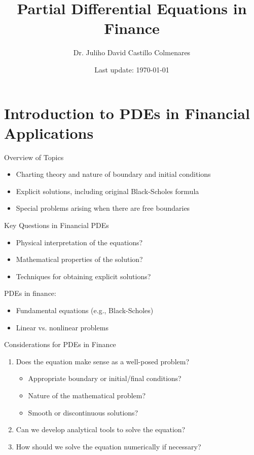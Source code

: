 \documentclass{beamer}
\title{Partial Differential Equations in Finance}
\author{Dr. Juliho David Castillo Colmenares}
\date{Last update: \today}
\begin{document}
\frame{\titlepage}

\section{Introduction to PDEs in Financial Applications}

\begin{frame}{Overview of Topics}
    \begin{itemize}
        \item Charting theory and nature of boundary and initial conditions
        \item Explicit solutions, including original Black-Scholes formula
        \item Special problems arising when there are free boundaries
    \end{itemize}
\end{frame}

\begin{frame}{Key Questions in Financial PDEs}
    \begin{itemize}
        \item Physical interpretation of the equations?
        \item Mathematical properties of the solution?
        \item Techniques for obtaining explicit solutions?
    \end{itemize}
    
    \vspace{1cm}
    PDEs in finance:
    \begin{itemize}
        \item Fundamental equations (e.g., Black-Scholes)
        \item Linear vs. nonlinear problems
    \end{itemize}
\end{frame}

\begin{frame}{Considerations for PDEs in Finance}
    \begin{enumerate}
        \item Does the equation make sense as a well-posed problem?
        \begin{itemize}
            \item Appropriate boundary or initial/final conditions?
            \item Nature of the mathematical problem?
            \item Smooth or discontinuous solutions?
        \end{itemize}
        
        \item Can we develop analytical tools to solve the equation?
        
        \item How should we solve the equation numerically if necessary?
    \end{enumerate}
\end{frame}
\end{document}
